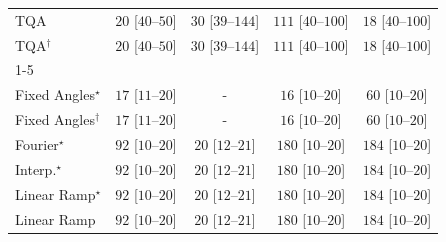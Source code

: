\begin{tabular}{l|cccc|}
TQA & {\cellcolor[HTML]{E8F6E4}} \color[HTML]{000000} $20$ [$40$--$50$] & {\cellcolor[HTML]{DDF2D8}} \color[HTML]{000000} $30$ [$39$--$144$] & {\cellcolor[HTML]{4BB062}} \color[HTML]{F1F1F1} $111$ [$40$--$100$] & {\cellcolor[HTML]{EAF7E6}} \color[HTML]{000000} $18$ [$40$--$100$] \\
TQA$^\dagger$ & {\cellcolor[HTML]{E8F6E4}} \color[HTML]{000000} $20$ [$40$--$50$] & {\cellcolor[HTML]{DDF2D8}} \color[HTML]{000000} $30$ [$39$--$144$] & {\cellcolor[HTML]{4BB062}} \color[HTML]{F1F1F1} $111$ [$40$--$100$] & {\cellcolor[HTML]{EAF7E6}} \color[HTML]{000000} $18$ [$40$--$100$] \\
\cline{1-5}
\multicolumn{5}{c}{\rule{0pt}{8pt}SV} \\
\midrule
Fixed Angles$^\star$ & {\cellcolor[HTML]{EBF7E7}} \color[HTML]{000000} $17$ [$11$--$20$] & {\cellcolor[HTML]{000000}} \color[HTML]{F1F1F1} {\cellcolor{white}} \color{black} - & {\cellcolor[HTML]{ECF8E8}} \color[HTML]{000000} $16$ [$10$--$20$] & {\cellcolor[HTML]{B1E0AB}} \color[HTML]{000000} $60$ [$10$--$20$] \\
Fixed Angles$^\dagger$ & {\cellcolor[HTML]{EBF7E7}} \color[HTML]{000000} $17$ [$11$--$20$] & {\cellcolor[HTML]{000000}} \color[HTML]{F1F1F1} {\cellcolor{white}} \color{black} - & {\cellcolor[HTML]{ECF8E8}} \color[HTML]{000000} $16$ [$10$--$20$] & {\cellcolor[HTML]{B1E0AB}} \color[HTML]{000000} $60$ [$10$--$20$] \\
Fourier$^\star$ & {\cellcolor[HTML]{75C477}} \color[HTML]{000000} $92$ [$10$--$20$] & {\cellcolor[HTML]{E8F6E4}} \color[HTML]{000000} $20$ [$12$--$21$] & {\cellcolor[HTML]{004A1E}} \color[HTML]{F1F1F1} $180$ [$10$--$20$] & {\cellcolor[HTML]{00441B}} \color[HTML]{F1F1F1} $184$ [$10$--$20$] \\
Interp.$^\star$ & {\cellcolor[HTML]{75C477}} \color[HTML]{000000} $92$ [$10$--$20$] & {\cellcolor[HTML]{E8F6E4}} \color[HTML]{000000} $20$ [$12$--$21$] & {\cellcolor[HTML]{004A1E}} \color[HTML]{F1F1F1} $180$ [$10$--$20$] & {\cellcolor[HTML]{00441B}} \color[HTML]{F1F1F1} $184$ [$10$--$20$] \\
Linear Ramp$^\star$ & {\cellcolor[HTML]{75C477}} \color[HTML]{000000} $92$ [$10$--$20$] & {\cellcolor[HTML]{E8F6E4}} \color[HTML]{000000} $20$ [$12$--$21$] & {\cellcolor[HTML]{004A1E}} \color[HTML]{F1F1F1} $180$ [$10$--$20$] & {\cellcolor[HTML]{00441B}} \color[HTML]{F1F1F1} $184$ [$10$--$20$] \\
Linear Ramp & {\cellcolor[HTML]{75C477}} \color[HTML]{000000} $92$ [$10$--$20$] & {\cellcolor[HTML]{E8F6E4}} \color[HTML]{000000} $20$ [$12$--$21$] & {\cellcolor[HTML]{004A1E}} \color[HTML]{F1F1F1} $180$ [$10$--$20$] & {\cellcolor[HTML]{00441B}} \color[HTML]{F1F1F1} $184$ [$10$--$20$] \\

\end{tabular}

